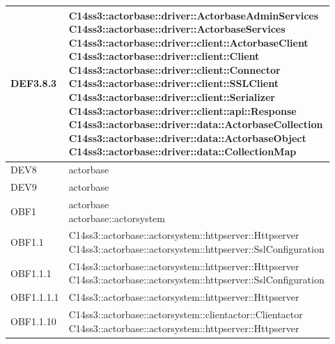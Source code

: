 \documentclass{scalatekids-article}
\begin{document}
\begin{longtable}[H]{|p{4.5cm}|p{13cm}|}
\hline
DEF3.8.3 & \multiLineCell[t]{C14ss3::actorbase::driver::ActorbaseAdminServices\\C14ss3::actorbase::driver::ActorbaseServices\\C14ss3::actorbase::driver::client::ActorbaseClient\\C14ss3::actorbase::driver::client::Client\\C14ss3::actorbase::driver::client::Connector\\C14ss3::actorbase::driver::client::SSLClient\\C14ss3::actorbase::driver::client::Serializer\\C14ss3::actorbase::driver::client::api::Response\\C14ss3::actorbase::driver::data::ActorbaseCollection\\C14ss3::actorbase::driver::data::ActorbaseObject\\C14ss3::actorbase::driver::data::CollectionMap\\}\\
\hline
DEV8 & \multiLineCell[t]{actorbase\\}\\
\hline
DEV9 & \multiLineCell[t]{actorbase\\}\\
\hline
OBF1 & \multiLineCell[t]{actorbase\\actorbase::actorsystem\\}\\
\hline
OBF1.1 & \multiLineCell[t]{C14ss3::actorbase::actorsystem::httpserver::Httpserver\\C14ss3::actorbase::actorsystem::httpserver::SslConfiguration\\}\\
\hline
OBF1.1.1 & \multiLineCell[t]{C14ss3::actorbase::actorsystem::httpserver::Httpserver\\C14ss3::actorbase::actorsystem::httpserver::SslConfiguration\\}\\
\hline
OBF1.1.1.1 & \multiLineCell[t]{C14ss3::actorbase::actorsystem::httpserver::Httpserver\\}\\
\hline
OBF1.1.10 & \multiLineCell[t]{C14ss3::actorbase::actorsystem::clientactor::Clientactor\\C14ss3::actorbase::actorsystem::httpserver::Httpserver\\}\\

\end{longtable}
\end{document}
